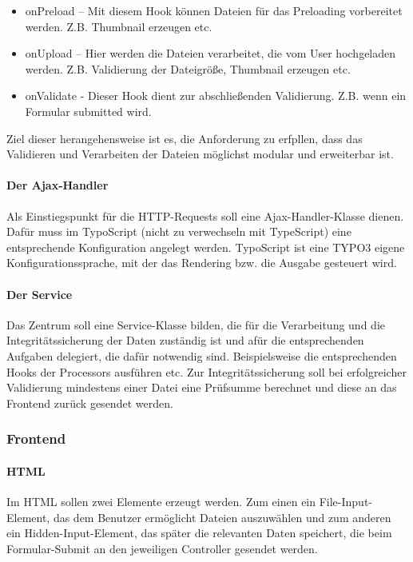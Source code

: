 \begin{itemize}
	\item onPreload 	– Mit diesem Hook können Dateien für das Preloading vorbereitet werden. Z.B. Thumbnail erzeugen etc.
	\item onUpload 		– Hier werden die Dateien verarbeitet, die vom User hochgeladen werden. Z.B. Validierung der Dateigröße, Thumbnail erzeugen etc.
	\item onValidate	- Dieser Hook dient zur abschließenden Validierung. Z.B. wenn ein Formular submitted wird.
\end{itemize}

Ziel dieser herangehensweise ist es, die Anforderung zu erfpllen, dass das Validieren und Verarbeiten der Dateien möglichst modular und erweiterbar ist.

\paragraph{Der Ajax-Handler} Als Einstiegspunkt für die HTTP-Requests soll eine Ajax-Handler-Klasse dienen. Dafür muss im TypoScript (nicht zu verwechseln mit TypeScript) eine entsprechende Konfiguration angelegt werden. TypoScript ist eine TYPO3 eigene Konfigurationssprache, mit der das Rendering bzw. die Ausgabe gesteuert wird.

\paragraph{Der Service} Das Zentrum soll eine Service-Klasse bilden, die für die Verarbeitung und die Integritätssicherung der Daten zuständig ist und afür die entsprechenden Aufgaben delegiert, die dafür notwendig sind. Beispielsweise die entsprechenden Hooks der Processors ausführen etc. Zur Integritätssicherung soll bei erfolgreicher Validierung mindestens einer Datei eine Prüfsumme berechnet und diese an das Frontend zurück gesendet werden.

\subsubsection{Frontend}
\label{sec:Frontend}

\paragraph{HTML} Im HTML sollen zwei Elemente erzeugt werden. Zum einen ein File-Input-Element, das dem Benutzer ermöglicht Dateien auszuwählen und zum anderen ein Hidden-Input-Element, das später die relevanten Daten speichert, die beim Formular-Submit an den jeweiligen Controller gesendet werden. 

